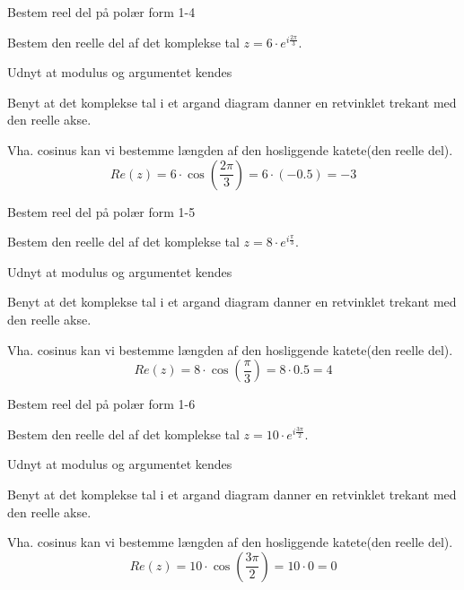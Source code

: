 \documentclass{article}
\begin{document}
\newpage

\begin{exercise}{Bestem reel del på polær form 1-4}
	
	Bestem den reelle del af det komplekse tal $z=6 \cdot e^{i \frac{2 \pi}{3}}$.
	
	
	
	\hint 
	
	Udnyt at modulus og argumentet kendes
	
	
	\hint
	
	Benyt at det komplekse tal i et argand diagram danner en retvinklet trekant med den reelle akse. 
	
	\hint 
	
	Vha. cosinus kan vi bestemme længden af den hosliggende katete(den reelle del).
	\[
	Re(z) =  6 \cdot \cos\left(\frac{2 \pi}{3} \right) = 6 \cdot (-0.5) = -3
	\]
	
\end{exercise}

\newpage

\begin{exercise}{Bestem reel del på polær form 1-5}
	
	
Bestem den reelle del af det komplekse tal $z=8 \cdot e^{i \frac{\pi}{3}}$.



\hint 

Udnyt at modulus og argumentet kendes


\hint

Benyt at det komplekse tal i et argand diagram danner en retvinklet trekant med den reelle akse. 

\hint 

Vha. cosinus kan vi bestemme længden af den hosliggende katete(den reelle del).
\[
Re(z) =  8 \cdot \cos\left(\frac{\pi}{3} \right) = 8 \cdot 0.5 = 4
\]
	
\end{exercise}

\newpage

\begin{exercise}{Bestem reel del på polær form 1-6}
	
	
Bestem den reelle del af det komplekse tal $z=10 \cdot e^{i \frac{3 \pi}{2}}$.



\hint 

Udnyt at modulus og argumentet kendes


\hint

Benyt at det komplekse tal i et argand diagram danner en retvinklet trekant med den reelle akse. 

\hint 

Vha. cosinus kan vi bestemme længden af den hosliggende katete(den reelle del).
\[
Re(z) =  10 \cdot \cos\left(\frac{3 \pi}{2} \right) = 10 \cdot 0 = 0
\]
	
\end{exercise}
\end{document}

